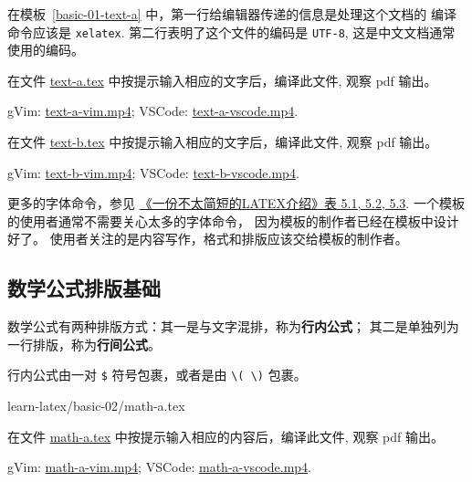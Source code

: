 \documentclass[
    11pt,
    base=hide,
    cite=authoryear,
    device=phone,
    lang=cn,
    mode=simple,
    result=answer,
    toc=onecol,
]{elegantbook_sierxue}
\begin{document}
在模板~\ref{basic-01-text-a} 中，第一行给编辑器传递的信息是处理这个文档的
编译命令应该是 \texttt{xelatex}.
第二行表明了这个文件的编码是 \texttt{UTF-8}, 这是中文文档通常使用的编码。

\begin{exercise}\label{ex:text-a}
    在文件
    \href{learn-latex/basic-01/text-a.tex}{text-a.tex}
    中按提示输入相应的文字后，编译此文件, 观察 pdf 输出。
\end{exercise}
\begin{cast}\label{cast:text-a}
    gVim: \href{media/casts/text-a-vim.mp4}{text-a-vim.mp4};
    VSCode: \href{media/casts/text-a-vscode.mp4}{text-a-vscode.mp4}.
\end{cast}

\begin{exercise}\label{ex:text-b}
    在文件
    \href{learn-latex/basic-01/text-b.tex}{text-b.tex}
    中按提示输入相应的文字后，编译此文件, 观察 pdf 输出。
\end{exercise}
\begin{cast}\label{cast:text-b}
    gVim: \href{media/casts/text-b-vim.mp4}{text-b-vim.mp4};
    VSCode: \href{media/casts/text-b-vscode.mp4}{text-b-vscode.mp4}.
\end{cast}
\begin{share}\label{share:user-designer}
    更多的字体命令，参见
    \hyperlink{books/lshort-zh-cn.pdf.74}%
    {《一份不太简短的LATEX介绍》表 5.1, 5.2, 5.3}.
    一个模板的使用者通常不需要关心太多的字体命令，
    因为模板的制作者已经在模板中设计好了。
    使用者关注的是内容写作，格式和排版应该交给模板的制作者。
\end{share}

\subsection{数学公式排版基础}%
\label{sub:latex-math-equation}

\begin{latex}\label{tex:math}
    数学公式有两种排版方式：其一是与文字混排，称为\textbf{行内公式}；
    其二是单独列为一行排版，称为\textbf{行间公式}。
\end{latex}

\begin{latex}\label{tex:math-inline}
    行内公式由一对 \texttt{\$} 符号包裹，或者是由 \lstinline|\( \)| 包裹。
\end{latex}
%
{learn-latex/basic-02/math-a.tex}
\begin{exercise}\label{ex:math-a}
    在文件
    \href{learn-latex/basic-02/math-a.tex}{math-a.tex}
    中按提示输入相应的内容后，编译此文件, 观察 pdf 输出。
\end{exercise}
\begin{cast}\label{cast:math-a}
    gVim: \href{media/casts/math-a-vim.mp4}{math-a-vim.mp4};
    VSCode: \href{media/casts/math-a-vscode.mp4}{math-a-vscode.mp4}.
\end{cast}
\end{document}

